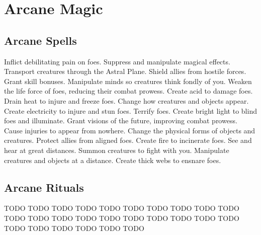 \small
\section{Arcane Magic}\label{Arcane Magic}
\subsection{Arcane Spells}\label{Arcane Spells}
\begin{spelllist}
 Inflict debilitating pain on foes.
 Suppress and manipulate magical effects.
 Transport creatures through the Astral Plane.
 Shield allies from hostile forces.
 Grant skill bonuses.
 Manipulate minds so creatures think fondly of you.
 Weaken the life force of foes, reducing their combat prowess.
 Create acid to damage foes.
 Drain heat to injure and freeze foes.
 Change how creatures and objects appear.
 Create electricity to injure and stun foes.
 Terrify foes.
 Create bright light to blind foes and illuminate.
 Grant visions of the future, improving combat prowess.
 Cause injuries to appear from nowhere.
 Change the physical forms of objects and creatures.
 Protect allies from aligned foes.
 Create fire to incinerate foes.
 See and hear at great distances.
 Summon creatures to fight with you.
 Manipulate creatures and objects at a distance.
 Create thick webs to ensnare foes.
\end{spelllist}
\subsection{Arcane Rituals}\label{Arcane Rituals}
\begin{spelllist}
 TODO
 TODO
 TODO
 TODO
 TODO
 TODO
 TODO
 TODO
 TODO
 TODO
 TODO
 TODO
 TODO
 TODO
 TODO
 TODO
 TODO
 TODO
 TODO
 TODO
 TODO
 TODO
 TODO
 TODO
 TODO
 TODO
\end{spelllist}
\small
